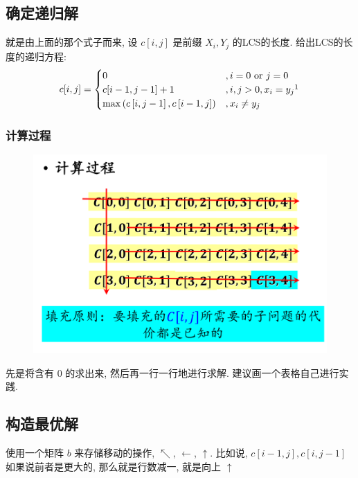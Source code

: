 \documentclass[a4paper, 10pt]{ctexart} %
\begin{document}
\subsection{确定递归解}
就是由上面的那个式子而来, 设 $c [i, j]$ 是前缀 $X_{i}, Y_{j}$ 的LCS的长度. 
给出LCS的长度的递归方程:
\[
c[i,j] = 
\begin{cases}
    0 &, i= 0  \text{ or } j = 0 \\
    c[i-1, j-1] + 1 & , i, j > 0, x_i = y_j\footnotemark\\
    \max \left(c \left[ i, j-1 \right], c \left[ i -1, j \right]\right) & , 
    x_i \ne y_j
\end{cases}
\]
\subsubsection*{计算过程}
\begin{figure}[H]
    \centering
    \includegraphics[scale =0.5]{12.png}
\end{figure}

先是将含有 $0$ 的求出来, 然后再一行一行地进行求解. 建议画一个表格自己进行实践.

\subsection{构造最优解}
使用一个矩阵 $b$ 来存储移动的操作, $\nwarrow$, $\gets$, $\uparrow$.
比如说, $c[i-1, j], c\left[ i, j-1 \right]$ 如果说前者是更大的, 那么就是行数减一, 就是向上 $\uparrow$
\end{document}
